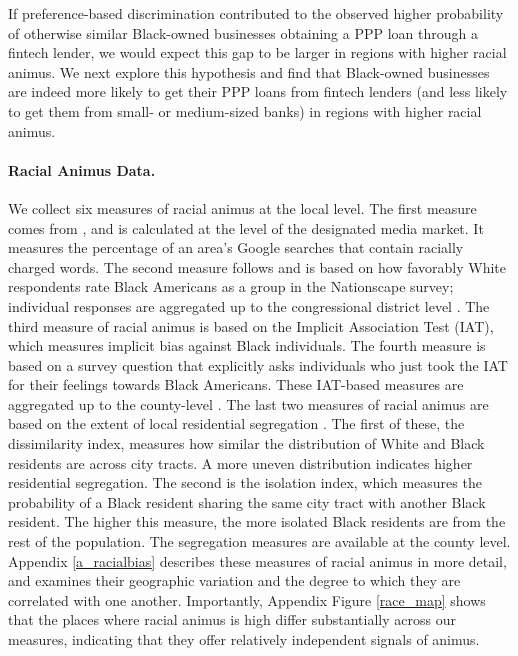 \documentclass[11pt]{article}
\begin{document}
If preference-based discrimination contributed to the observed higher probability of otherwise similar Black-owned businesses obtaining a PPP loan through a fintech lender, we would expect this gap to be larger in regions with higher racial animus. We next explore this hypothesis and find that Black-owned businesses are indeed more likely to get their PPP loans from fintech lenders (and less likely to get them from small- or medium-sized banks) in regions with higher racial animus.

\paragraph*{Racial Animus Data.}

We collect six measures of racial animus at the local level.  The first measure comes from \cite{stephens2013cost}, and is calculated at the level of the designated media market. It measures the percentage of an area's Google searches that contain racially charged words. The second measure follows \cite{bursztyn2021immigrant} and is based on how favorably White respondents rate Black Americans as a group in the Nationscape survey; individual responses are aggregated up to the congressional district level \citep{tausanovitch2020democracy}. The third measure of racial animus is based on the Implicit Association Test (IAT), which measures implicit bias against Black individuals. The fourth measure is based on a survey question that explicitly asks individuals who just took the IAT for their feelings towards Black Americans. These IAT-based measures are aggregated up to the county-level \citep{xu2014psychology}. The last two measures of racial animus are based on the extent of local residential segregation \citep{massey1988dimensions}. The first of these, the dissimilarity index, measures how similar the distribution of White and Black residents are across city tracts. A more uneven distribution indicates higher residential segregation. The second is the isolation index, which measures the probability of a Black resident sharing the same city tract with another Black resident. The higher this measure, the more isolated Black residents are from the rest of the population. The segregation measures are available at the county level. Appendix \ref{a_racialbias} describes these measures of racial animus in more detail, and examines their geographic variation and the degree to which they are correlated with one another. Importantly, Appendix Figure \ref{race_map} shows that the places where racial animus is high differ substantially across our measures, indicating that they offer relatively independent signals of animus.
\end{document}
